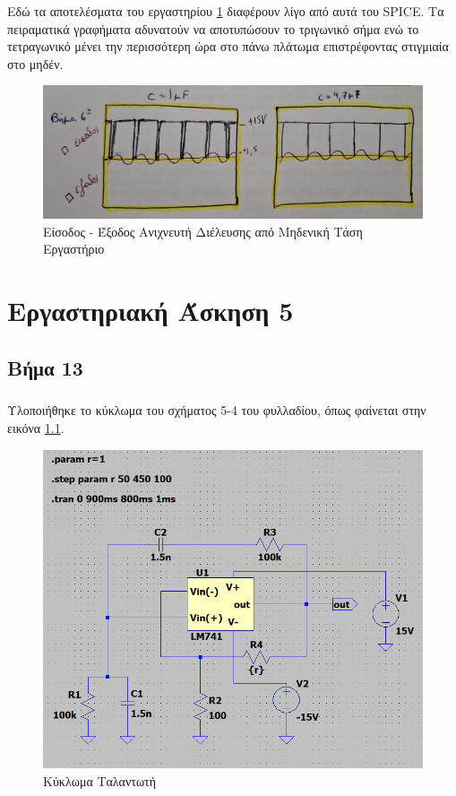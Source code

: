 \documentclass[11pt,a4paper,twoside,onecolumn,openright,final]{memoir}
\begin{document}
Εδώ τα αποτελέσματα του εργαστηρίου \ref{fig:ex4lab3} διαφέρουν λίγο από αυτά του SPICE. Τα πειραματικά γραφήματα αδυνατούν να αποτυπώσουν το τριγωνικό σήμα ενώ το τετραγωνικό μένει την περισσότερη ώρα στο πάνω πλάτωμα επιστρέφοντας στιγμιαία στο μηδέν. 
\begin{figure}[H]
    \centering
    \includegraphics[width=0.8\linewidth]{figures/Exercise4_lab_step6.jpg}
    \caption{Είσοδος - Έξοδος Ανιχνευτή Διέλευσης από Μηδενική Τάση Εργαστήριο}
    \label{fig:ex4lab3}
\end{figure}

\chapter{Εργαστηριακή Άσκηση 5}

\section{Βήμα 13}

\paragraph*{} Υλοποιήθηκε το κύκλωμα του σχήματος 5-4 του φυλλαδίου, όπως φαίνεται στην εικόνα \ref{fig:ex5circuit}.

\begin{figure}[h]
\centerfloat%
\includegraphics[width=12.0cm]{figures/exercise5circuit1.png}
\caption{Κύκλωμα Ταλαντωτή}\label{fig:ex5circuit}
\end{figure}
\end{document}

